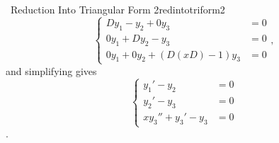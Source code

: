 \begin{example}{\Difficulty\,\Difficulty\,\,Reduction Into Triangular Form 2}{redintotriform2}
            \begin{equation*}
                \begin{cases}
                    Dy_1-y_2+0y_3&=0 \\
                    0y_1+Dy_2-y_3&=0 \\
                    0y_1+0y_2+(D(xD)-1)y_3&=0
                \end{cases},
            \end{equation*}
            and simplifying gives
            \begin{equation*}
                \begin{cases}
                    y_1'-y_2&=0 \\
                    y_2'-y_3&=0 \\
                    xy_3''+y_3'-y_3&=0
                \end{cases}
            \end{equation*}.
        \end{example}